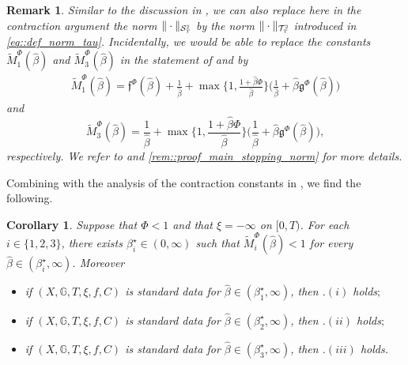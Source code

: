 \documentclass[10pt]{article} %
\newtheorem{corollary}[theorem]{Corollary}
\newtheorem{remark}[theorem]{Remark}
\newcommand\cS{\mathcal S}
\newcommand\cT{\mathcal T}
\newcommand{\smalltext}[1]{\text{\fontsize{4}{4}\selectfont$#1$}}
\newcommand\ff{\mathfrak f}
\newcommand\fg{\mathfrak g}
\def \G{\mathbb{G}}
\newcommand{\1}{\mathbf{1}}
\begin{document}
\begin{remark}\label{rem::bsde_stopping_norm}
	Similar to the discussion in , we can also replace here in the contraction argument the norm $\|\cdot\|_{\cS^\smalltext{2}_\smalltext{T}}$ by the norm $\|\cdot\|_{\cT^\smalltext{2}_\smalltext{T}}$ introduced in \eqref{eq::def_norm_tau}. Incidentally, we would be able to replace the constants $\widetilde M_1^\Phi(\hat\beta)$ and $\widetilde M_3^\Phi(\hat\beta)$ in the statement of {\rm{}} and {\rm{}} by
	\begin{align*}
	\widetilde M_1^\Phi(\hat\beta) = \ff^\Phi(\hat\beta) + \frac{1}{\hat\beta} + \max\bigg\{1,\frac{1+\hat\beta\Phi}{\hat\beta}\bigg\}\bigg(\frac{1}{\hat\beta} + \hat\beta \fg^\Phi(\hat\beta)\bigg)
\end{align*}
and
\begin{equation*}
	\widetilde M_3^\Phi(\hat\beta) = \frac{1}{\hat\beta} + \max\bigg\{1,\frac{1+\hat\beta\Phi}{\hat\beta}\bigg\}\bigg(\frac{1}{\hat\beta} + \hat\beta \fg^\Phi(\hat\beta)\bigg),
\end{equation*}
respectively. We refer to {\rm{}} and {\rm\ref{rem::proof_main_stopping_norm}} for more details.
\end{remark}

Combining  with the analysis of the contraction constants in , we find the following.

\begin{corollary}\label{cor::main_result_bsde}
Suppose that $\Phi < 1$ and that $\xi = -\infty$ on $[0,T)$. For each $i \in \{1,2,3\}$, there exists $\beta^\star_i \in (0,\infty)$ such that $\widetilde M^\Phi_i(\hat\beta) <1$ for every $\hat\beta \in (\beta^\star_i,\infty)$. Moreover
	\begin{itemize}
		\item[$(i)$] if $(X,\G,T,\xi,f,C)$ is standard data for $\hat\beta \in (\beta^\star_1,\infty)$, then {\rm{}.$(i)$} holds$;$
		\item[$(ii)$] if $(X,\G,T,\xi,f,C)$ is standard data for $\hat\beta \in (\beta^\star_2,\infty)$, then {\rm{}.$(ii)$} holds$;$
		\item[$(iii)$] if $(X,\G,T,\xi,f,C)$ is standard data for $\hat\beta \in (\beta^\star_3,\infty)$, then {\rm{}.$(iii)$} holds.
	\end{itemize}
\end{corollary}
\end{document}
